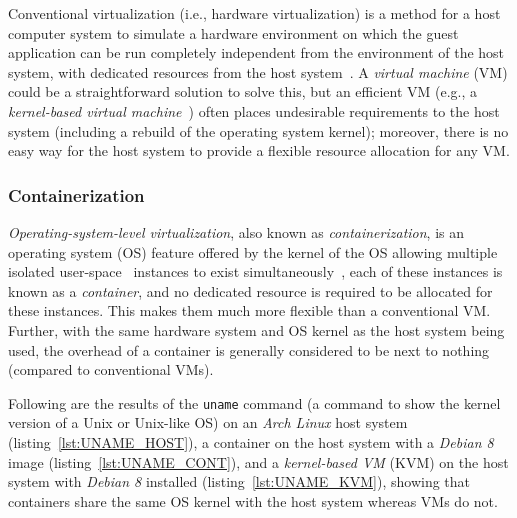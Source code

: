 \medskip

Conventional virtualization (i.e., hardware virtualization) is a method for a
host computer system to simulate a hardware environment on which the guest
application can be run completely independent from the environment of the host
system, with dedicated resources from the host system~\citep[chapter 16]{os}.
A \emph{virtual machine} (VM) could be a straightforward solution to solve
this,
but an efficient VM
(e.g., a \emph{kernel-based virtual machine}~\cite{kvm}) 
often places undesirable requirements to the host system 
(including a rebuild of the operating system kernel);
moreover, there is no easy way for the host system to provide a flexible
resource allocation for any VM.

\subsubsection{Containerization}
\emph{Operating-system-level virtualization}, also known as
\emph{containerization}, is an operating system (OS) feature offered by the
kernel of the OS allowing multiple isolated user-space~\citep[section 1.5.1]{os}
instances to exist simultaneously~\cite{docker},
each of these instances is known as a \emph{container}, and no dedicated resource
is required to be allocated for these instances.
This makes them much more
flexible than a conventional VM.
Further, with the same hardware system and
OS kernel as the host system being used, the overhead of a container is
generally considered to be next to nothing (compared to conventional VMs).

\pagebreak

Following are the results of the \texttt{uname} command
(a command to show the kernel version of a Unix or Unix-like OS)
on an \emph{Arch Linux} host system (listing~\ref{lst:UNAME_HOST}),
a container on the host system with a \emph{Debian 8}~\cite{debian} image
(listing~\ref{lst:UNAME_CONT}),
and a \emph{kernel-based VM} (KVM) on the host system with \emph{Debian 8} installed
(listing~\ref{lst:UNAME_KVM}),
showing that containers share the same OS kernel with the host system whereas
VMs do not.


\begin{centering}



\end{centering}

